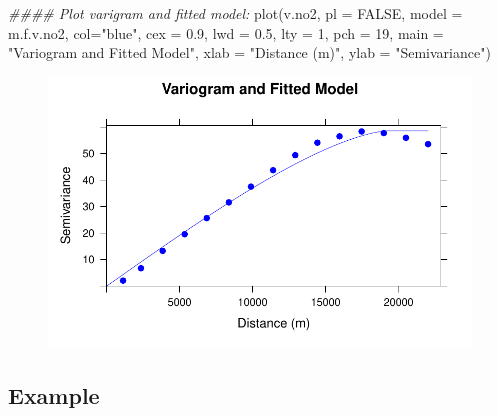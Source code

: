 \documentclass[
  letterpaper,
  DIV=11,
  numbers=noendperiod]{scrreprt}
\newenvironment{Shaded}{\begin{snugshade}}{\end{snugshade}}
\newcommand{\AttributeTok}[1]{\textcolor[rgb]{0.40,0.45,0.13}{#1}}
\newcommand{\ConstantTok}[1]{\textcolor[rgb]{0.56,0.35,0.01}{#1}}
\newcommand{\DecValTok}[1]{\textcolor[rgb]{0.68,0.00,0.00}{#1}}
\newcommand{\DocumentationTok}[1]{\textcolor[rgb]{0.37,0.37,0.37}{\textit{#1}}}
\newcommand{\FloatTok}[1]{\textcolor[rgb]{0.68,0.00,0.00}{#1}}
\newcommand{\FunctionTok}[1]{\textcolor[rgb]{0.28,0.35,0.67}{#1}}
\newcommand{\NormalTok}[1]{\textcolor[rgb]{0.00,0.23,0.31}{#1}}
\newcommand{\StringTok}[1]{\textcolor[rgb]{0.13,0.47,0.30}{#1}}
\begin{document}
\begin{Shaded}
\begin{Highlighting}[]
\DocumentationTok{\#\#\#\# Plot varigram and fitted model:}
\FunctionTok{plot}\NormalTok{(v.no2, }\AttributeTok{pl =} \ConstantTok{FALSE}\NormalTok{, }
     \AttributeTok{model =}\NormalTok{ m.f.v.no2,}
     \AttributeTok{col=}\StringTok{"blue"}\NormalTok{, }
     \AttributeTok{cex =} \FloatTok{0.9}\NormalTok{, }
     \AttributeTok{lwd =} \FloatTok{0.5}\NormalTok{,}
     \AttributeTok{lty =} \DecValTok{1}\NormalTok{,}
     \AttributeTok{pch =} \DecValTok{19}\NormalTok{,}
     \AttributeTok{main =} \StringTok{"Variogram and Fitted Model"}\NormalTok{,}
     \AttributeTok{xlab =} \StringTok{"Distance (m)"}\NormalTok{,}
     \AttributeTok{ylab =} \StringTok{"Semivariance"}\NormalTok{)}
\end{Highlighting}
\end{Shaded}

\begin{figure}[H]

{\centering \includegraphics{04_dependence_files/figure-pdf/unnamed-chunk-12-1.pdf}

}

\end{figure}

\hypertarget{example}{%
\subsection{Example}\label{example}}
\end{document}
